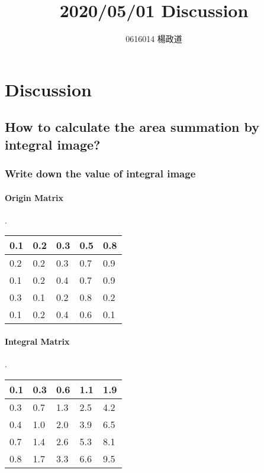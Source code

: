 \title{2020/05/01 Discussion}
\author{0616014 楊政道}
\maketitle
\thispagestyle{fancy}
\section{Discussion}
\subsection{How to calculate the area summation by integral image?}
\subsubsection{Write down the value of integral image}
\paragraph{Origin Matrix}
.
\begin{table}[!ht]
\centering
\begin{tabular}{|l|l|l|l|l|}
\hline
0.1 & 0.2 & 0.3 & 0.5 & 0.8 \\ \hline
0.2 & 0.2 & 0.3 & 0.7 & 0.9 \\ \hline
0.1 & 0.2 & 0.4 & 0.7 & 0.9 \\ \hline
0.3 & 0.1 & 0.2 & 0.8 & 0.2 \\ \hline
0.1 & 0.2 & 0.4 & 0.6 & 0.1 \\ \hline
\end{tabular}
\end{table}

\paragraph{Integral Matrix}
.
\begin{table}[!ht]
\centering
\begin{tabular}{|l|l|l|l|l|}
\hline
0.1 & 0.3 & 0.6 & 1.1 & 1.9 \\ \hline
0.3 & 0.7 & 1.3 & 2.5 & 4.2 \\ \hline
0.4 & 1.0 & 2.0 & 3.9 & 6.5 \\ \hline
0.7 & 1.4 & 2.6 & 5.3 & 8.1 \\ \hline
0.8 & 1.7 & 3.3 & 6.6 & 9.5 \\ \hline
\end{tabular}
\end{table}
